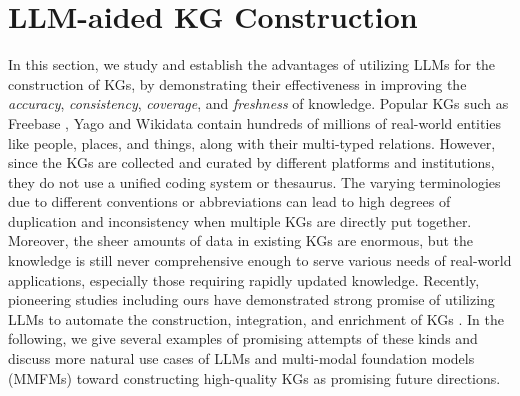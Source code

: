 \section{LLM-aided KG Construction}
In this section, we study and establish the advantages of utilizing LLMs for the construction of KGs, by demonstrating their effectiveness in improving the \textit{accuracy}, \textit{consistency}, \textit{coverage}, and \textit{freshness} of knowledge. %
Popular KGs such as Freebase \cite{bollacker2008freebase}, Yago \cite{suchanek2008yago} and Wikidata \cite{vrandevcic2014wikidata} contain hundreds of millions of real-world entities like people, places, and things, along with their multi-typed relations. However, since the KGs are collected and curated by different platforms and institutions, they do not use a unified coding system or thesaurus. The varying terminologies due to different conventions or abbreviations can lead to high degrees of duplication and inconsistency when multiple KGs are directly put together. 
Moreover, the sheer amounts of data in existing KGs are enormous, but the knowledge is still never comprehensive enough to serve various needs of real-world applications, especially those requiring rapidly updated knowledge.
Recently, pioneering studies including ours have demonstrated strong promise of utilizing LLMs to automate the construction, integration, and enrichment of KGs \cite{zhu2023llms, ye2022generative, qin2023chatgpt, kommineni2024human, zhang2024extract, vizcarra2024representing, yu2023bear, hu2023llm, meyer2023llm, hofer2024towards, yang2024graphusion}. In the following, we give several examples of promising attempts of these kinds and discuss more natural use cases of LLMs and multi-modal foundation models (MMFMs) toward constructing high-quality KGs as promising future directions. 

